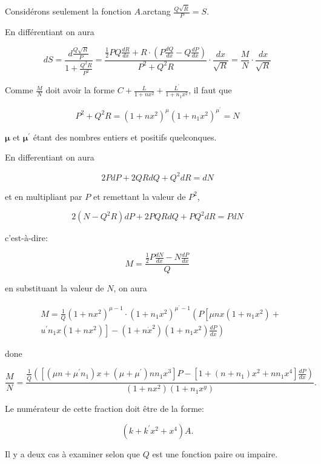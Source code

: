 \documentclass{article}
\begin{document}
Considérons seulement la fonction \(A\).arctang \(\frac{Q \sqrt{\bar{R}}}{P}=S\).

En différentiant on aura

\[
d S=\frac{d \frac{Q \sqrt{R}}{P}}{1+\frac{Q^{2} R}{P^{2}}}=\frac{\frac{1}{2} P Q \frac{d R}{d x}+R \cdot\left(P \frac{d Q}{d x}-Q \frac{d P}{d x}\right)}{P^{2}+Q^{2} R} \cdot \frac{d x}{\sqrt{R}}=\frac{M}{N} \cdot \frac{d x}{\sqrt{R}}
\]

Comme \(\frac{M}{N}\) doit avoir la forme \(C+\frac{L}{1+n x^{2}}+\frac{L^{\prime}}{1+n_{1} x^{2}}\), il faut que

\[
P^{2}+Q^{2} R=\left(1+n x^{2}\right)^{\mu}\left(1+n_{1} x^{2}\right)^{\mu^{\prime}}=N
\]

\(\boldsymbol{\mu}\) et \(\boldsymbol{\mu}^{\prime}\) étant des nombres entiers et positifs quelconques.

En differentiant on aura

\[
2 P d P+2 Q R d Q+Q^{2} d R=d N
\]

et en multipliant par \(P\) et remettant la valeur de \(P^{2}\),

\[
2\left(N-Q^{2} R\right) d P+2 P Q R d Q+P Q^{2} d R=P d N
\]

c'est-à-dire:

\[
M=\frac{\frac{1}{2} P \frac{d N}{d x}-N \frac{d P}{d x}}{Q}
\]

en substituant la valeur de \(N\), on aura

\[
\begin{aligned}
& M=\frac{1}{Q}\left(1+n x^{2}\right)^{\mu-1} \cdot\left(1+n_{1} x^{2}\right)^{\mu^{\prime}-1}\left(P \left[\mu n x\left(1+n_{1} x^{2}\right)+\right.\right. \\
&\left.\left.u^{\prime} n_{1} x\left(1+n x^{2}\right)\right]-\left(1+n \dot{x}^{2}\right)\left(1+n_{1} x^{2}\right) \frac{d P}{d x}\right)
\end{aligned}
\]

done

\[
\frac{M}{N}=\frac{\frac{1}{\bar{Q}}\left(\left[\left(\mu n+\mu^{\prime} n_{1}\right) x+\left(\mu+\mu^{\prime}\right) n n_{1} x^{3}\right] P-\left[1+\left(n+n_{1}\right) x^{2}+n n_{1} x^{4}\right] \frac{d P}{d x}\right)}{\left(1+n x^{2}\right)\left(1+n_{1} x^{y}\right)} .
\]

Le numérateur de cette fraction doit être de la forme:

\[
\left(k+k^{\prime} x^{2}+x^{4}\right) A .
\]

Il y a deux cas à examiner selon que \(Q\) est une fonction paire ou impaire.
\end{document}
